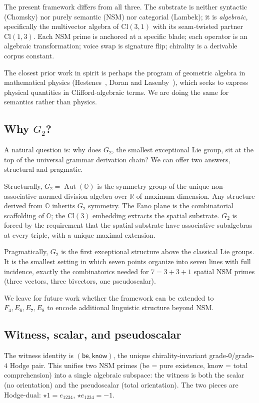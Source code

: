 \documentclass[11pt,a4paper]{article}
\theoremstyle{plain}
\theoremstyle{definition}
\theoremstyle{remark}
\numberwithin{equation}{section}
\providecommand{\Cl}{\mathrm{Cl}}
\providecommand{\OO}{\mathbb{O}}
\providecommand{\RR}{\mathbb{R}}
\DeclareMathOperator{\Aut}{Aut}
\begin{document}
The present framework differs from all three.  The substrate is
neither syntactic (Chomsky) nor purely semantic (NSM) nor
categorial (Lambek); it is \emph{algebraic}, specifically the
multivector algebra of $\Cl(3,1)$ with its seam-twisted partner
$\Cl(1,3)$.  Each NSM prime is anchored at a specific blade; each
operator is an algebraic transformation; voice swap is signature
flip; chirality is a derivable corpus constant.

The closest prior work in spirit is perhaps the program of
geometric algebra in mathematical physics
(Hestenes~\cite{hestenes1984}, Doran and
Lasenby~\cite{doran2003}), which seeks to express physical
quantities in Clifford-algebraic terms.  We are doing the same for
semantics rather than physics.

\subsection{Why $G_2$?}

A natural question is: why does $G_2$, the smallest exceptional
Lie group, sit at the top of the universal grammar derivation
chain?  We can offer two answers, structural and pragmatic.

Structurally, $G_2 = \Aut(\OO)$ is the symmetry group of the
unique non-associative normed division algebra over $\RR$ of
maximum dimension.  Any structure derived from $\OO$ inherits
$G_2$ symmetry.  The Fano plane is the combinatorial scaffolding
of $\OO$; the $\Cl(3)$ embedding extracts the spatial substrate.
$G_2$ is forced by the requirement that the spatial substrate
have associative subalgebras at every triple, with a unique
maximal extension.

Pragmatically, $G_2$ is the first exceptional structure above the
classical Lie groups.  It is the smallest setting in which seven
points organize into seven lines with full incidence, exactly the
combinatorics needed for $7 = 3 + 3 + 1$ spatial NSM primes (three
vectors, three bivectors, one pseudoscalar).

We leave for future work whether the framework can be extended to
$F_4, E_6, E_7, E_8$ to encode additional linguistic structure
beyond NSM.

\subsection{Witness, scalar, and pseudoscalar}

The witness identity is $(\mathsf{be}, \mathsf{know})$, the unique
chirality-invariant grade-$0$/grade-$4$ Hodge pair.  This unifies
two NSM primes (\textsf{be} = pure existence, \textsf{know} =
total comprehension) into a single algebraic subspace: the witness
is both the scalar (no orientation) and the pseudoscalar (total
orientation).  The two pieces are Hodge-dual: $\star 1 = e_{1234}$,
$\star e_{1234} = -1$.
\end{document}
